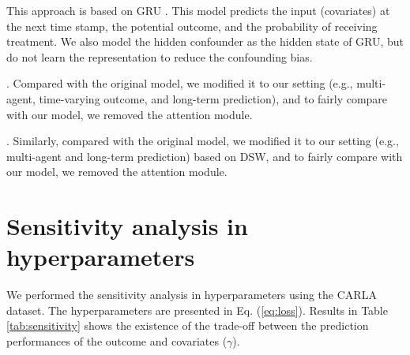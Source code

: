  This approach is based on GRU \cite{Cho14}. This model predicts the input (covariates) at the next time stamp, the potential outcome, and the probability of receiving treatment.
We also model the hidden confounder as the hidden state of GRU, but do not learn the representation to reduce the confounding bias.  

 \cite{liu2020estimating}. Compared with the original model, we modified it to our setting (e.g., multi-agent, time-varying outcome, and long-term prediction), and to fairly compare with our model, we removed the attention module. 

 \cite{ma2021deconfounding}. Similarly, compared with the original model, we modified it to our setting (e.g., multi-agent and long-term prediction) based on DSW, and to fairly compare with our model, we removed the attention module. 


\section{Sensitivity analysis in hyperparameters}
\label{app:sensitivity}

We performed the sensitivity analysis in hyperparameters using the CARLA dataset. 
The hyperparameters are presented in Eq. (\ref{eq:loss}).
Results in Table \ref{tab:sensitivity} shows the existence of the trade-off between the prediction performances of the outcome and covariates ($\gamma$).  

